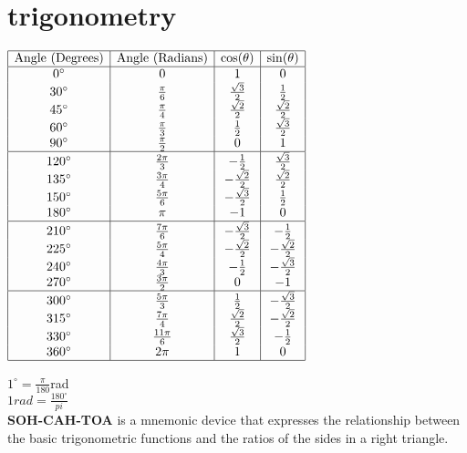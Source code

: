 \documentclass{article}
\begin{document}
\section*{trigonometry}

$
\begin{array}{|c|c|c|c|}
\hline
\text{Angle (Degrees)} & \text{Angle (Radians)} & \cos(\theta) & \sin(\theta) \\
\hline
0^\circ & 0 & 1 & 0 \\
30^\circ & \frac{\pi}{6} & \frac{\sqrt{3}}{2} & \frac{1}{2} \\
45^\circ & \frac{\pi}{4} & \frac{\sqrt{2}}{2} & \frac{\sqrt{2}}{2} \\
60^\circ & \frac{\pi}{3} & \frac{1}{2} & \frac{\sqrt{3}}{2} \\
90^\circ & \frac{\pi}{2} & 0 & 1 \\
\hline
120^\circ & \frac{2\pi}{3} & -\frac{1}{2} & \frac{\sqrt{3}}{2} \\
135^\circ & \frac{3\pi}{4} & -\frac{\sqrt{2}}{2} & \frac{\sqrt{2}}{2} \\
150^\circ & \frac{5\pi}{6} & -\frac{\sqrt{3}}{2} & \frac{1}{2} \\
180^\circ & \pi & -1 & 0 \\
\hline
210^\circ & \frac{7\pi}{6} & -\frac{\sqrt{3}}{2} & -\frac{1}{2} \\
225^\circ & \frac{5\pi}{4} & -\frac{\sqrt{2}}{2} & -\frac{\sqrt{2}}{2} \\
240^\circ & \frac{4\pi}{3} & -\frac{1}{2} & -\frac{\sqrt{3}}{2} \\
270^\circ & \frac{3\pi}{2} & 0 & -1 \\
\hline
300^\circ & \frac{5\pi}{3} & \frac{1}{2} & -\frac{\sqrt{3}}{2} \\
315^\circ & \frac{7\pi}{4} & \frac{\sqrt{2}}{2} & -\frac{\sqrt{2}}{2} \\
330^\circ & \frac{11\pi}{6} & \frac{\sqrt{3}}{2} & -\frac{1}{2} \\
360^\circ & 2\pi & 1 & 0 \\
\hline
\end{array}
$

$1^\circ = \frac{\pi}{180}$rad\\
$1 rad = \frac{180^\circ}{pi}$\\

\textbf{SOH-CAH-TOA} is a mnemonic device that expresses the relationship between the basic trigonometric functions and the ratios of the sides in a right triangle.\\
\end{document}
